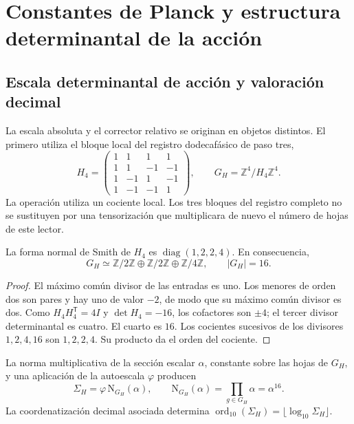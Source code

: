 \section{Constantes de Planck y estructura determinantal de la acción}
\label{sec:action}
\subsection{Escala determinantal de acción y valoración decimal}

La escala absoluta y el corrector relativo se originan en objetos
distintos. El primero utiliza el bloque local del registro dodecafásico
de paso tres,
\begin{equation}
 H_4=\begin{pmatrix}
 1&1&1&1\\1&1&-1&-1\\1&-1&1&-1\\1&-1&-1&1
 \end{pmatrix},\qquad
 G_H=\mathbb Z^4/H_4\mathbb Z^4.
 \label{eq:el-h4}
\end{equation}
La operación utiliza un cociente local. Los tres bloques del registro
completo no se sustituyen por una tensorización que multiplicara de
nuevo el número de hojas de este lector.

\begin{lemma}
La forma normal de Smith de \(H_4\) es
\(\operatorname{diag}(1,2,2,4)\). En consecuencia,
\[
 G_H\simeq\mathbb Z/2\mathbb Z\oplus\mathbb Z/2\mathbb Z
 \oplus\mathbb Z/4\mathbb Z,\qquad |G_H|=16.
\]
\end{lemma}
\begin{proof}
El máximo común divisor de las entradas es uno. Los menores de orden dos
son pares y hay uno de valor \(-2\), de modo que su máximo común divisor
es dos. Como \(H_4H_4^{\mathsf T}=4I\) y \(\det H_4=-16\), los
cofactores son \(\pm4\); el tercer divisor determinantal es cuatro.
El cuarto es \(16\). Los cocientes sucesivos de los divisores
\(1,2,4,16\) son \(1,2,2,4\). Su producto da el orden del cociente.
\end{proof}

\begin{definition}
La norma multiplicativa de la sección escalar \(\alpha\), constante
sobre las hojas de \(G_H\), y una aplicación de la autoescala
\(\varphi\) producen
\begin{equation}
 \Sigma_H=\varphi\,\mathrm N_{G_H}(\alpha),\qquad
 \mathrm N_{G_H}(\alpha)=\prod_{g\in G_H}\alpha=\alpha^{16}.
 \label{eq:el-lector-determinantal}
\end{equation}
La coordenatización decimal asociada determina
\(\operatorname{ord}_{10}(\Sigma_H)=\lfloor\log_{10}\Sigma_H\rfloor\).
\end{definition}

